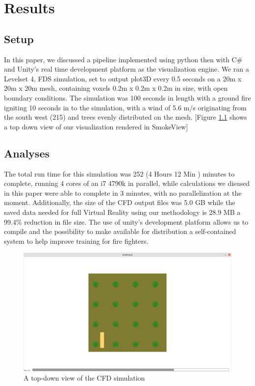 
\chapter{Results} %

\label{Chapter3} %

\section{Setup}
In this paper, we discussed a pipeline implemented using python then with C\# and Unity's real time development platform as the visualization engine. We ran a Levelset 4, FDS simulation, set to output plot3D every 0.5 seconds on a 20m x 20m x 20m mesh, containing voxels  0.2m x 0.2m x 0.2m  in size, with open boundary conditions. The simulation was 100 seconds in length with a ground fire igniting 10 seconds in to the simulation, with a wind of 5.6 m/s originating from the south west (215\textdegree) and trees evenly distributed on the mesh. [Figure \ref{fig:CFDTopDown} shows a top down view of our visualization rendered in SmokeView] \par
[Github link to fds file?]\par
\section{Analyses}
The total run time for this simulation was  \color{red}252 (4 Hours 12 Min ) \color{black} minutes to complete, running 4 cores of an i7 4790k in parallel, while calculations we disused in this paper were able to complete in \color{red} 3 \color{black} minutes, with no parallelization at the moment. Additionally, the size of the CFD output files was 5.0 GB while the saved data needed for full Virtual Reality using our methodology is 28.9 MB a 99.4\% reduction in file size. The use of unity's development platform allows us to compile and the possibility to make available for distribution a self-contained system to help improve training for fire fighters.


\begin{figure}
\centering
\includegraphics[scale=.1]{Figures/fdsPartTopView.png}
\decoRule
\caption[CFD Simulation]{A top-down view of the CFD simulation}
\label{fig:CFDTopDown}
\end{figure}